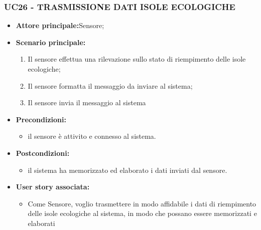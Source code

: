 \subsubsection{UC26 - TRASMISSIONE DATI ISOLE ECOLOGICHE}
\begin{itemize}
    \item \textbf{Attore principale:}Sensore;
    \item \textbf{Scenario principale:}
          \begin{enumerate}
              \item Il sensore effettua una rilevazione sullo stato di riempimento delle isole ecologiche;
              \item Il sensore formatta il messaggio da inviare al sistema;
              \item Il sensore invia il messaggio al sistema
          \end{enumerate}
    \item \textbf{Precondizioni:}
          \begin{itemize}
              \item  il sensore è attivito e connesso al sistema. 
          \end{itemize}
    \item \textbf{Postcondizioni:}
          \begin{itemize}
              \item  il sistema ha memorizzato ed elaborato i dati inviati dal sensore.
          \end{itemize}
    \item \textbf{User story associata:}
          \begin{itemize}
            \item Come Sensore, voglio trasmettere in modo affidabile i dati di riempimento delle isole ecologiche al sistema, in modo che possano essere memorizzati e elaborati 
          \end{itemize}
\end{itemize}
